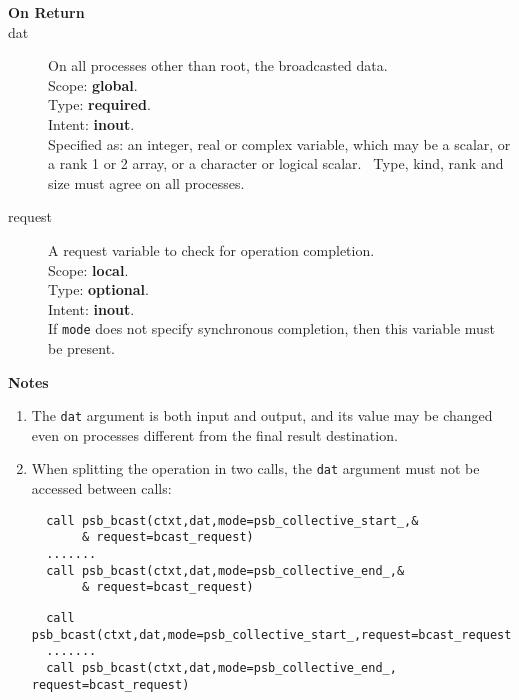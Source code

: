 \begin{description}
\item[\bf On Return]
\item[dat] On all processes other than  root, the broadcasted data.\\
Scope: {\bf global}.\\
Type: {\bf required}.\\
Intent: {\bf inout}.\\
Specified as: an integer, real or complex variable, which may be a
scalar, or a rank 1 or 2 array, or a character or logical scalar. \
Type, kind, rank and size must agree on all processes.
\item[request] A request variable to check for operation completion.\\
Scope: {\bf local}.\\
Type: {\bf optional}.\\
Intent: {\bf inout}.\\
If \verb|mode| does not specify synchronous completion, then this
variable must be present.
\end{description}

{\par\noindent\large\bfseries Notes}
\begin{enumerate}
\item The \verb|dat| argument is both input and output, and its
  value may be changed even on processes different from the final
  result destination.
\item When splitting the operation in two calls, the \verb|dat|
  argument  must not be accessed between calls:
\ifpdf
\begin{verbatim}
  call psb_bcast(ctxt,dat,mode=psb_collective_start_,&
       & request=bcast_request)
  .......
  call psb_bcast(ctxt,dat,mode=psb_collective_end_,&
       & request=bcast_request)
\end{verbatim}
\else
\begin{center}
    \begin{minipage}[tl]{0.9\textwidth}
\begin{verbatim} 
  call psb_bcast(ctxt,dat,mode=psb_collective_start_,request=bcast_request)
  .......
  call psb_bcast(ctxt,dat,mode=psb_collective_end_, request=bcast_request)
\end{verbatim}
    \end{minipage}
  \end{center}
\fi
\end{enumerate}





